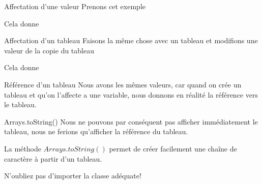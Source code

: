 \begin{frame}{Affectation d'une valeur}
    \pause
    Prenons cet exemple
    

    \pause
    Cela donne
    
\end{frame}

\begin{frame}{Affectation d'un tableau}
    Faisons la même chose avec un tableau et modifions une valeur de la copie du tableau
    

    \pause
    Cela donne
    

\end{frame}

\begin{frame}{Référence d'un tableau}
    Nous avons les mêmes valeurs, car quand on crée un tableau et qu'on l'affecte a une variable,
    nous donnons en réalité la référence vers le tableau.

    \pause
    \begin{exampleblock}{Arrays.toString()}
        Nous ne pouvons par conséquent pas afficher immédiatement le tableau,
        nous ne ferions qu'afficher la référence du tableau.

        \pause
        La méthode $Arrays.toString()$ permet de créer facilement une chaîne de caractère à partir d'un tableau.

        \pause
        \tiny\center N’oubliez pas d'importer la classe adéquate!
        
    \end{exampleblock}
\end{frame}